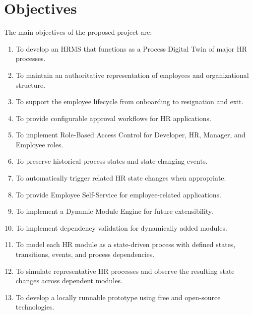 \documentclass[12pt,a4paper]{article}
\begin{document}

\section{Objectives}

The main objectives of the proposed project are:

\begin{enumerate}

    \item To develop an HRMS that functions as a Process Digital
    Twin of major HR processes.

    \item To maintain an authoritative representation of employees
    and organizational structure.

    \item To support the employee lifecycle from onboarding to
    resignation and exit.

    \item To provide configurable approval workflows for HR
    applications.

    \item To implement Role-Based Access Control for Developer, HR,
    Manager, and Employee roles.

    \item To preserve historical process states and state-changing
    events.

    \item To automatically trigger related HR state changes when
    appropriate.

    \item To provide Employee Self-Service for employee-related
    applications.

    \item To implement a Dynamic Module Engine for future
    extensibility.

    \item To implement dependency validation for dynamically added
    modules.

    \item To model each HR module as a state-driven process with
    defined states, transitions, events, and process dependencies.

    \item To simulate representative HR processes and observe the
    resulting state changes across dependent modules.

    \item To develop a locally runnable prototype using free and
    open-source technologies.

\end{enumerate}
\end{document}
